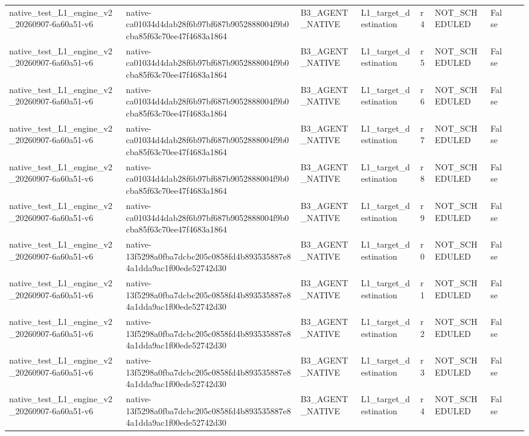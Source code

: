 \begin{tabular}{lllllllll}
native\_test\_L1\_engine\_v2\_20260907-6a60a51-v6 & native-ca01034d4dab28f6b97bf687b9052888004f9b0cba85f63c70ee47f4683a1864 & B3\_AGENT\_NATIVE & L1\_target\_destination & r4 & NOT\_SCHEDULED & False &  &  \\
native\_test\_L1\_engine\_v2\_20260907-6a60a51-v6 & native-ca01034d4dab28f6b97bf687b9052888004f9b0cba85f63c70ee47f4683a1864 & B3\_AGENT\_NATIVE & L1\_target\_destination & r5 & NOT\_SCHEDULED & False &  &  \\
native\_test\_L1\_engine\_v2\_20260907-6a60a51-v6 & native-ca01034d4dab28f6b97bf687b9052888004f9b0cba85f63c70ee47f4683a1864 & B3\_AGENT\_NATIVE & L1\_target\_destination & r6 & NOT\_SCHEDULED & False &  &  \\
native\_test\_L1\_engine\_v2\_20260907-6a60a51-v6 & native-ca01034d4dab28f6b97bf687b9052888004f9b0cba85f63c70ee47f4683a1864 & B3\_AGENT\_NATIVE & L1\_target\_destination & r7 & NOT\_SCHEDULED & False &  &  \\
native\_test\_L1\_engine\_v2\_20260907-6a60a51-v6 & native-ca01034d4dab28f6b97bf687b9052888004f9b0cba85f63c70ee47f4683a1864 & B3\_AGENT\_NATIVE & L1\_target\_destination & r8 & NOT\_SCHEDULED & False &  &  \\
native\_test\_L1\_engine\_v2\_20260907-6a60a51-v6 & native-ca01034d4dab28f6b97bf687b9052888004f9b0cba85f63c70ee47f4683a1864 & B3\_AGENT\_NATIVE & L1\_target\_destination & r9 & NOT\_SCHEDULED & False &  &  \\
native\_test\_L1\_engine\_v2\_20260907-6a60a51-v6 & native-13f5298a0fba7dcbc205c0858fd4b893535887e84a1dda9ac1f00ede52742d30 & B3\_AGENT\_NATIVE & L1\_target\_destination & r0 & NOT\_SCHEDULED & False &  &  \\
native\_test\_L1\_engine\_v2\_20260907-6a60a51-v6 & native-13f5298a0fba7dcbc205c0858fd4b893535887e84a1dda9ac1f00ede52742d30 & B3\_AGENT\_NATIVE & L1\_target\_destination & r1 & NOT\_SCHEDULED & False &  &  \\
native\_test\_L1\_engine\_v2\_20260907-6a60a51-v6 & native-13f5298a0fba7dcbc205c0858fd4b893535887e84a1dda9ac1f00ede52742d30 & B3\_AGENT\_NATIVE & L1\_target\_destination & r2 & NOT\_SCHEDULED & False &  &  \\
native\_test\_L1\_engine\_v2\_20260907-6a60a51-v6 & native-13f5298a0fba7dcbc205c0858fd4b893535887e84a1dda9ac1f00ede52742d30 & B3\_AGENT\_NATIVE & L1\_target\_destination & r3 & NOT\_SCHEDULED & False &  &  \\
native\_test\_L1\_engine\_v2\_20260907-6a60a51-v6 & native-13f5298a0fba7dcbc205c0858fd4b893535887e84a1dda9ac1f00ede52742d30 & B3\_AGENT\_NATIVE & L1\_target\_destination & r4 & NOT\_SCHEDULED & False &  &  \\

\end{tabular}
